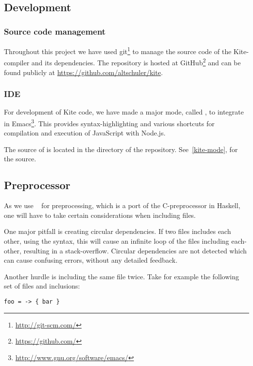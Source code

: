 
\subsection{Development}
\subsubsection{Source code management}
Throughout this project we have used git\footnote{\url{http://git-scm.com/}} to manage the source code of the Kite-compiler and its dependencies. The repository is hosted at GitHub\footnote{\url{https://github.com/}} and can be found publicly at \url{https://github.com/altschuler/kite}.

\subsubsection{IDE}
For development of Kite code, we have made a major mode, called , to integrate in Emacs\footnote{\url{http://www.gnu.org/software/emacs/}}. This provides syntax-highlighting and various shortcuts for compilation and execution of JavaScript with Node.js.

The source of  is located in the  directory of the repository. See~\ref{kite-mode}, for the source.


\subsection{Preprocessor}
As we use ~\cite{wallace04} for preprocessing, which is a port of the C-preprocessor in Haskell, one will have to take certain considerations when including files.

One major pitfall is creating circular dependencies. If two files includes each other, using the  syntax, this will cause an infinite loop of the files including each-other, resulting in a stack-overflow. Circular dependencies are not detected which can cause confusing errors, without any detailed feedback.

Another hurdle is including the same file twice. Take for example the following set of files and inclusions:

\begin{lstlisting}[caption=\code{grandfather.kite}]
foo = -> { bar }
\end{lstlisting}

